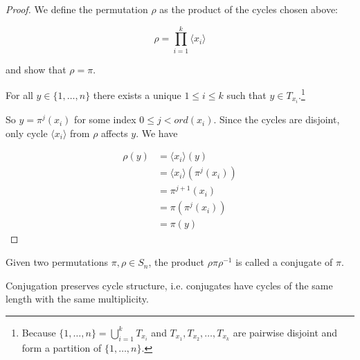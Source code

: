 \begin{proof}
We define the permutation $\rho$ as the product of the cycles chosen above:

$$
\rho=\prod\limits^k_{i=1} \langle x_i \rangle
$$

and show that $\rho=\pi$. 

For all $y \in \{1, \ldots, n\}$ there exists a unique $1 \leq i \leq k$ such that $y \in T_{x_i}$.\footnote{Because $\{1, \ldots, n\} = \bigcup^{k}_{i=1} T_{x_i}$ and $T_{x_1}, T_{x_2}, \ldots, T_{x_k}$ are pairwise disjoint and form a partition of $\{1, \ldots, n\}$.}

So $y = \pi^j(x_i)$ for some index $0 \leq j < ord(x_i)$. Since the cycles are disjoint, only cycle $\langle x_i \rangle$ from $\rho$ affects $y$. We have

\begin{align*}
\rho(y) &= \langle x_i \rangle (y) \\
        &= \langle x_i \rangle (\pi^j(x_i)) \\
        &= \pi^{j+1}(x_i) \\
        &= \pi(\pi^j(x_i)) \\
        &= \pi(y)
\end{align*}

\end{proof}

Given two permutations $\pi, \rho \in S_n$, the product $\rho \pi \rho^{-1}$ is called a conjugate of $\pi$.

\begin{thm}\label{conjugationPreservesCycles}
Conjugation preserves cycle structure, i.e. conjugates have cycles of the same length with the same multiplicity.
\end{thm}


